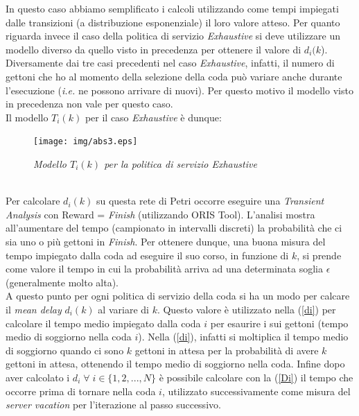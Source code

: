 \documentclass[12pt,a4paper,italian]{article}
\begin{document}
In questo caso abbiamo semplificato i calcoli utilizzando come tempi impiegati dalle transizioni (a distribuzione esponenziale) il loro valore atteso.
Per quanto riguarda invece il caso della politica di servizio \emph{Exhaustive} si deve utilizzare un modello diverso da quello visto in precedenza per ottenere il valore di $d_i(k$). Diversamente dai tre casi precedenti nel caso \emph{Exhaustive}, infatti, il numero di gettoni che ho al momento della selezione della coda può variare anche durante l'esecuzione (\emph{i.e.} ne possono arrivare di nuovi). Per questo motivo il modello visto in precedenza non vale per questo caso. \\ 
Il modello $T_i(k)$ per il caso \emph{Exhaustive} è dunque: \\
\begin{figure}[!ht]
	\centering
	\texttt{[image: img/abs3.eps]}
	\caption{\emph{Modello $T_i(k)$ per la politica di servizio Exhaustive}}
	\label{ads3}
\end{figure}\\
Per calcolare $d_i(k)$ su questa rete di Petri occorre eseguire una \emph{Transient Analysis} con Reward = \emph{Finish} (utilizzando ORIS Tool). L'analisi mostra all'aumentare del tempo (campionato in intervalli discreti) la probabilità che ci sia uno o più gettoni in \emph{Finish}. Per ottenere dunque, una buona misura del tempo impiegato dalla coda ad eseguire il suo corso, in funzione di $k$, si prende come valore il tempo in cui la probabilità arriva ad una determinata soglia $\epsilon$ (generalmente molto alta).\\
\newline
A questo punto per ogni politica di servizio della coda si ha un modo per calcare il \emph{mean delay} $d_i(k)$ al variare di $k$. Questo valore è utilizzato nella (\ref{di}) per calcolare il tempo medio impiegato dalla coda $i$ per esaurire i sui gettoni (tempo medio di soggiorno nella coda $i$). Nella (\ref{di}), infatti si moltiplica il tempo medio di soggiorno quando ci sono $k$ gettoni in attesa per la probabilità di avere $k$ gettoni in attesa, ottenendo il tempo medio di soggiorno nella coda. Infine dopo aver calcolato i $d_i \; \forall \;i  \in \{1,2,...,N\}$ è possibile calcolare con la (\ref{Di}) il tempo che occorre prima di tornare nella coda $i$, utilizzato successivamente come misura del \emph{server vacation} per l'iterazione al passo successivo.\\
\end{document}
